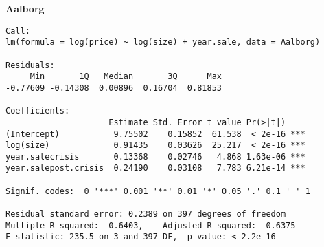 \textbf{Aalborg}
\begin{lstlisting}
Call:
lm(formula = log(price) ~ log(size) + year.sale, data = Aalborg)

Residuals:
     Min       1Q   Median       3Q      Max 
-0.77609 -0.14308  0.00896  0.16704  0.81853 

Coefficients:
                     Estimate Std. Error t value Pr(>|t|)    
(Intercept)           9.75502    0.15852  61.538  < 2e-16 ***
log(size)             0.91435    0.03626  25.217  < 2e-16 ***
year.salecrisis       0.13368    0.02746   4.868 1.63e-06 ***
year.salepost.crisis  0.24190    0.03108   7.783 6.21e-14 ***
---
Signif. codes:  0 '***' 0.001 '**' 0.01 '*' 0.05 '.' 0.1 ' ' 1

Residual standard error: 0.2389 on 397 degrees of freedom
Multiple R-squared:  0.6403,	Adjusted R-squared:  0.6375 
F-statistic: 235.5 on 3 and 397 DF,  p-value: < 2.2e-16
\end{lstlisting}